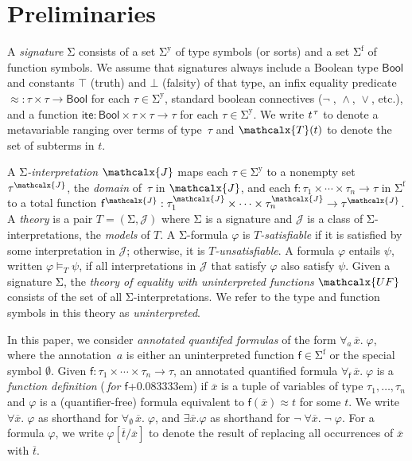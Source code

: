 \documentclass[runningheads,a4paper]{llncs}
\newcommand{\con}[1]{\mathsf{#1}}
\renewcommand\vec[1]{\overline{#1}}
\let\oldSigma=\Sigma
\def\Sigma{\mathrm{\oldSigma}}
\let\oldneg=\neg
\def\neg{\oldneg\;}
\let\oldvee=\vee
\def\vee{\mathrel{\oldvee}}
\let\oldwedge=\wedge
\def\wedge{\mathrel{\oldwedge}}
\newcommand{\teq}{\approx}
\newcommand{\terms}{\mathcalx{T}}
\newcommand{\I}{\mathcalx{J}} %
\newcommand{\ssorts}[1]{#1^\mathrm{y}}
\newcommand{\sfuns}[1]{#1^\mathrm{f}}
\newcommand{\sfundefs}[1]{#1^\mathrm{dfn}}
\newcommand\ty[1]{\con{#1}}
\newcommand{\Bool}{\ty{Bool}}
\newcommand{\ltrue}{\top}
\newcommand{\lfalse}{\bot}
\newcommand{\lite}{\con{ite}}
\newcommand{\forallf}[1]{\forall_{\!#1\:}}
\newcommand{\fnull}{\emptyset}
\newcommand{\vthinspace}{\kern+0.083333em}
\newcommand{\typ}[1]{^{\vthinspace #1}}
\newcommand{\Mo}{{\mathcal{\!J\!}}}
\newcommand{\euf}{\ensuremath{\mathcalx{UF}}\xspace}
\begin{document}
\section{Preliminaries}
\label{sec:prelim}

A \emph{signature} $\Sigma$ consists of
a set $\ssorts{\Sigma}$ of type symbols (or sorts) and
a set $\sfuns{\Sigma}$ of function symbols.
We assume that signatures always include a Boolean type $\Bool$ and constants
$\ltrue$ (truth) and $\lfalse$ (falsity) of that type,
an infix equality predicate ${\teq} : \tau \times \tau \to \Bool$
for each $\tau \in \ssorts{\Sigma}$,
standard boolean connectives ($\neg$, $\wedge$, $\vee$, etc.),
and a function $\lite : \Bool \times \tau \times \tau \rightarrow \tau$ for each $\tau \in \ssorts{\Sigma}$.
We write $t\typ{\tau}$ to denote a metavariable ranging over terms of
type~$\tau$ and $\terms( t )$ to denote the set of subterms in $t$.

A \emph{$\Sigma$-interpretation $\I$} %
maps each $\tau \in \ssorts{\Sigma}$ to a nonempty set $\tau^\I$,
the \emph{domain} of~$\tau$ in $\I$,
and each $\con{f} : \tau_1 \times \cdots \times \tau_n \rightarrow \tau$ in
$\sfuns{\Sigma}$
to a total function $\con{f}^\I : \tau_1^\I \times \cdots \times \tau_n^\I \rightarrow \tau^\I$.
A \emph{theory} is a pair $T = (\Sigma, \Mo)$ where
$\Sigma$ is a signature and  $\Mo$ is a class of $\Sigma$-interpretations,
the \emph{models} of $T$.
A $\Sigma$-formula $\varphi$ is
\emph{$T$-satisfiable}
if it is satisfied by some interpretation in $\Mo$;
otherwise, it is \emph{$T$-unsatisfiable}.
A formula $\varphi$ entails $\psi$, written $\varphi \models_T \psi$,
if all interpretations in $\Mo$ that satisfy $\varphi$ also satisfy $\psi$.
Given a signature $\Sigma$,
the \emph{theory of equality with uninterpreted functions} \euf
consists of the set of all $\Sigma$-interpretations.
We refer to the type and function symbols in this theory as \emph{uninterpreted}.

In this paper, we consider \emph{annotated quantifed formulas} of the form
$\forallf{a} \vec x.\; \varphi$, where the annotation~$a$ is either
an uninterpreted function $\con{f} \in \sfuns{\Sigma}$ or the special symbol
$\fnull$.
Given $\con{f} : \tau_1 \times \cdots \times \tau_n \rightarrow \tau$,
an annotated
quantified formula $\forallf{\con{f}} \vec x.\; \varphi$ is a \emph{function definition}
(\,\emph{for $\con{f}$}\vthinspace) if $\vec x$ is a tuple of variables of type
$\tau_1, \ldots, \tau_n$ and $\varphi$ is a (quantifier-free) formula equivalent to
$\con{f}( \vec x ) \teq t$ for some $t$. We write $\forall \vec
x.\; \varphi$ as shorthand for $\forallf{\fnull} \vec x.\; \varphi$, and $\exists
\vec x. \varphi$ as shorthand for $\neg \forall \vec x.\; \neg \varphi$.
For a formula $\varphi$,
we write $\varphi[\vec t/\vec x]$ to denote the result of replacing all occurrences of $\vec x$ with $\vec t$.
\end{document}
